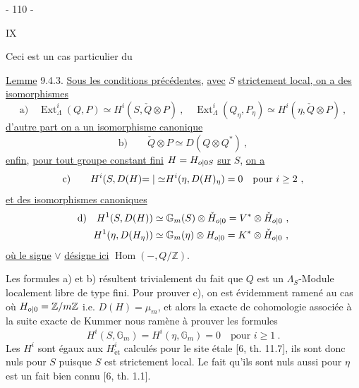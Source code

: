 \begin{center}- 110 -\end{center}\hfill IX

Ceci est un cas particulier du

\uline{Lemme} 9.4.3. \uline{Sous les conditions précédentes}, \uline{avec} $S$ \uline{strictement local, on a des isomorphismes}
\[
 \text{a)}\quad\operatorname{Ext}^i_\Lambda(Q,P)\simeq H^i(S,\check Q\otimes P)\ ,\quad
 \operatorname{Ext}^i_\Lambda(Q_\eta,P_\eta)\simeq H^i(\eta,\check Q\otimes P)\ ,
\]
\uline{d'autre part on a un isomorphisme canonique}
\[
 \text{b)}\qquad\check Q\otimes P\simeq D(Q\otimes Q^*)\ ,
\]
\uline{enfin}, \uline{pour tout groupe constant fini} $H=H_{{o|0}S}$ \uline{sur} $S$, \uline{on a}
\[
 \text{c)}\qquad H^i(S,D(H){=|\simeq}H^i(\eta,D(H)_\eta)=0\quad\text{{pour} }i\geq2\ ,
\]
\uline{et des isomorphismes canoniques}
\[
 \begin{aligned}
 \text{d)}\quad H^1(S,D(H))&\simeq\mathbb G_m(S)\otimes\check H_{{o|0}}=V^*\otimes\check H_{{o|0}}\ ,\\
 H^1(\eta,D(H_\eta))&\simeq\mathbb G_m(\eta)\otimes H_{{o|0}}=K^*\otimes\check H_{{o|0}}\ ,
 \end{aligned}
\]
\uline{où le signe} $\vee$ \uline{désigne ici} $\operatorname{Hom}(-,Q/\mathbb Z)$.

Les formules a) et b) résultent trivialement du fait que $Q$ est un $\Lambda_S$-Module localement libre de type fini. Pour prouver c), on est évidemment ramené au cas où $H_{{o|0}}=\mathbb Z/m\mathbb Z$ i.e. $D(H)=\mu_m$, et alors la  exacte de cohomologie associée à la suite exacte de Kummer
nous ramène à prouver les formules
\[
 H^i(S,\mathbb G_m)=H^i(\eta,\mathbb G_m)=0\quad\text{pour }i\geq1\ .
\]
Les $H^i$ sont égaux aux $H^i_{\mathrm{\acute et}}$ calculés pour le site étale [6, th. 11.7], ils sont donc nuls pour $S$ puisque $S$ est strictement local. Le fait qu'ils sont nuls aussi pour $\eta$ est un fait bien connu [6, th. 1.1].
